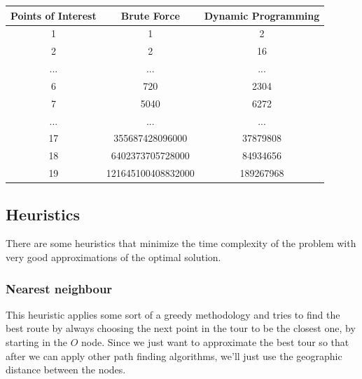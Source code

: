 \documentclass[a4paper, 12pt]{report}
\begin{document}
    \begin{table}[h]
        \begin{center}
         \begin{tabular}{||c c c||} 
         \hline
         Points of Interest & Brute Force & Dynamic Programming \\ [0.5ex] 
         \hline\hline
         1 & 1 & 2 \\ 
         \hline
         2 & 2 & 16  \\
         \hline
         ... & ... & ... \\
         \hline
         6 & 720 & 2304 \\
         \hline
         7 & 5040 & 6272 \\
         \hline
         ... & ... & ... \\
         \hline
         17 & 355687428096000 & 37879808\\
         \hline
         18 & 6402373705728000 & 84934656 \\
         \hline
         19 & 121645100408832000 & 189267968 \\[1ex]
         \hline
        \end{tabular}
        \end{center}
        \label{fig:bfdp}
    \end{table}
    
    \pagebreak
    
    \subsection{Heuristics} \label{heuristics}
    
    There are some heuristics that minimize the time complexity of the problem with very good approximations of the optimal solution. 
    
    \subsubsection{Nearest neighbour}
    
    This heuristic applies some sort of a greedy methodology and tries to find the best route by always choosing the next point in the tour to be the closest one, by starting in the $O$ node. Since we just want to approximate the best tour so that after we can apply other path finding algorithms, we'll just use the geographic distance between the nodes.
    
\end{document}
